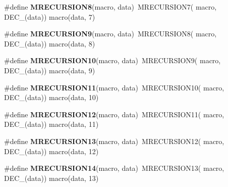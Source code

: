 \begin{DoxyCompactItemize}
\item 
\hypertarget{group__group__sam0__utils__mrecursion_gace2f177446f979d0bf7d57e29c37c51a}{}\#define {\bfseries M\+R\+E\+C\+U\+R\+S\+I\+O\+N8}(macro,  data)~M\+R\+E\+C\+U\+R\+S\+I\+O\+N7(  macro, D\+E\+C\+\_\+(data))   macro(data, 7)\label{group__group__sam0__utils__mrecursion_gace2f177446f979d0bf7d57e29c37c51a}

\item 
\hypertarget{group__group__sam0__utils__mrecursion_ga853bbeced4b6b519b64ed1a6dbccd492}{}\#define {\bfseries M\+R\+E\+C\+U\+R\+S\+I\+O\+N9}(macro,  data)~M\+R\+E\+C\+U\+R\+S\+I\+O\+N8(  macro, D\+E\+C\+\_\+(data))   macro(data, 8)\label{group__group__sam0__utils__mrecursion_ga853bbeced4b6b519b64ed1a6dbccd492}

\item 
\hypertarget{group__group__sam0__utils__mrecursion_ga3700eed97ae48ef8cbc22f11f4dbc78d}{}\#define {\bfseries M\+R\+E\+C\+U\+R\+S\+I\+O\+N10}(macro,  data)~M\+R\+E\+C\+U\+R\+S\+I\+O\+N9(  macro, D\+E\+C\+\_\+(data))   macro(data, 9)\label{group__group__sam0__utils__mrecursion_ga3700eed97ae48ef8cbc22f11f4dbc78d}

\item 
\hypertarget{group__group__sam0__utils__mrecursion_ga31b84f80986b74ca2475b949b3fb83e0}{}\#define {\bfseries M\+R\+E\+C\+U\+R\+S\+I\+O\+N11}(macro,  data)~M\+R\+E\+C\+U\+R\+S\+I\+O\+N10(  macro, D\+E\+C\+\_\+(data))   macro(data, 10)\label{group__group__sam0__utils__mrecursion_ga31b84f80986b74ca2475b949b3fb83e0}

\item 
\hypertarget{group__group__sam0__utils__mrecursion_ga2729e6d7bf9ad170f0b715d38b75e5b8}{}\#define {\bfseries M\+R\+E\+C\+U\+R\+S\+I\+O\+N12}(macro,  data)~M\+R\+E\+C\+U\+R\+S\+I\+O\+N11(  macro, D\+E\+C\+\_\+(data))   macro(data, 11)\label{group__group__sam0__utils__mrecursion_ga2729e6d7bf9ad170f0b715d38b75e5b8}

\item 
\hypertarget{group__group__sam0__utils__mrecursion_gac0cd2495b5a9a8b69ed7f701d5f15a47}{}\#define {\bfseries M\+R\+E\+C\+U\+R\+S\+I\+O\+N13}(macro,  data)~M\+R\+E\+C\+U\+R\+S\+I\+O\+N12(  macro, D\+E\+C\+\_\+(data))   macro(data, 12)\label{group__group__sam0__utils__mrecursion_gac0cd2495b5a9a8b69ed7f701d5f15a47}

\item 
\hypertarget{group__group__sam0__utils__mrecursion_ga5ae353c3b90a3403ded4a710d1c7a897}{}\#define {\bfseries M\+R\+E\+C\+U\+R\+S\+I\+O\+N14}(macro,  data)~M\+R\+E\+C\+U\+R\+S\+I\+O\+N13(  macro, D\+E\+C\+\_\+(data))   macro(data, 13)\label{group__group__sam0__utils__mrecursion_ga5ae353c3b90a3403ded4a710d1c7a897}


\end{DoxyCompactItemize}
